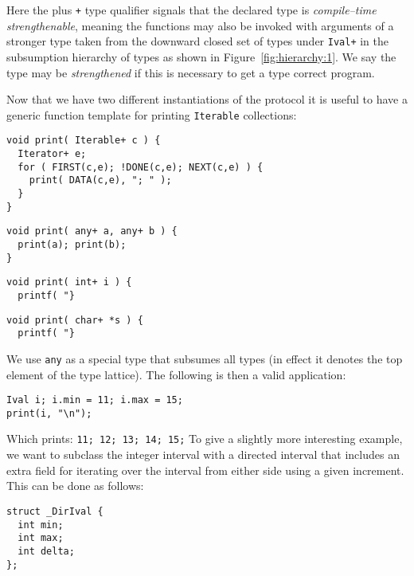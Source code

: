 \documentclass{sigplanconf}
\newcommand{\concept}[1]{\emph{#1}}
\begin{document}
Here the plus \verb-+- type qualifier signals that the declared type
is \concept{compile--time strengthenable}, meaning the functions may
also be invoked with arguments of a stronger type taken from the
downward closed set of types under \verb-Ival+- in the subsumption
hierarchy of types as shown in Figure~\ref{fig:hierarchy:1}. We say the
type may be \emph{strengthened} if this is necessary to get a type
correct program.

Now that we have two different instantiations of the protocol it is
useful to have a generic function template for printing
\verb+Iterable+ collections:
\begin{samepage}
\begin{verbatim}
void print( Iterable+ c ) {
  Iterator+ e;
  for ( FIRST(c,e); !DONE(c,e); NEXT(c,e) ) {
    print( DATA(c,e), "; " );
  }
}
\end{verbatim}
\end{samepage}
\begin{samepage}
\begin{verbatim}
void print( any+ a, any+ b ) {
  print(a); print(b);
}
\end{verbatim}
\end{samepage}
\begin{samepage}
\begin{verbatim}
void print( int+ i ) {
  printf( "}
\end{verbatim}
\end{samepage}
\begin{samepage}
\begin{verbatim}
void print( char+ *s ) {
  printf( "}
\end{verbatim}
\end{samepage}
We use \verb+any+ as a special type that subsumes all types (in effect
it denotes the top element of the type lattice). The following is then
a valid application:
\begin{samepage}
\begin{verbatim}
Ival i; i.min = 11; i.max = 15;
print(i, "\n");
\end{verbatim}
\end{samepage}
Which prints: \verb+11; 12; 13; 14; 15;+
To give a slightly more interesting example, we want to subclass the
integer interval with a directed interval that includes an extra field
for iterating over the interval from either side using a given
increment. This can be done as follows:
\begin{samepage}
\begin{verbatim}
struct _DirIval {
  int min;
  int max;
  int delta;
};
\end{verbatim}
\end{samepage}
\end{document}
